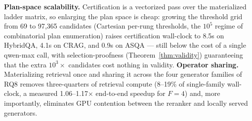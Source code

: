 \textbf{Plan-space scalability.} Certification is a vectorized pass
over the materialized ladder matrix, so enlarging the plan space is
cheap: growing the threshold grid from 69 to 97{,}365 candidates
(Cartesian per-rung thresholds, the $10^5$ regime of combinatorial
plan enumeration) raises certification wall-clock to 8.5s on HybridQA,
4.1s on CRAG, and 0.9s on ASQA --- still below the cost of a single
qwen-max call, with selection-proofness (Theorem~\ref{thm:validity})
guaranteeing that the extra $10^3\times$ candidates cost nothing in
validity. \textbf{Operator sharing.} Materializing retrieval once and
sharing it across the four generator families of RQ8 removes
three-quarters of retrieval compute (8--19\% of single-family
wall-clock, a measured 1.06--1.17$\times$ end-to-end speedup for
$F{=}4$) and, more importantly, eliminates GPU contention between the
reranker and locally served generators.
